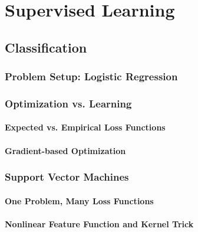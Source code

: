 \documentclass{report}
\begin{document}

\chapter{Supervised Learning}
\label{chap:supervised}

\section{Classification}
\label{sec:classification}

\subsection{Problem Setup: Logistic Regression}

\subsection{Optimization vs. Learning}

\subsubsection{Expected vs. Empirical Loss Functions}

\subsubsection{Gradient-based Optimization}

\subsection{Support Vector Machines}

\subsubsection{One Problem, Many Loss Functions}

\subsubsection{Nonlinear Feature Function and Kernel Trick}
\end{document}
